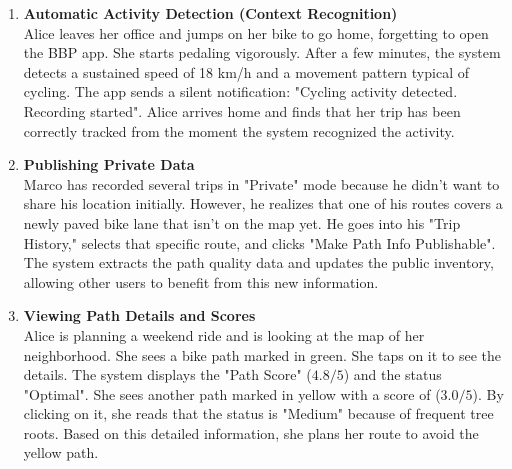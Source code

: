 \begin{enumerate}
    \item \textbf{Automatic Activity Detection (Context Recognition)} \\
    Alice leaves her office and jumps on her bike to go home, forgetting to open the BBP app. She starts pedaling vigorously. After a few minutes, the system detects a sustained speed of 18 km/h and a movement pattern typical of cycling. The app sends a silent notification: "Cycling activity detected. Recording started". Alice arrives home and finds that her trip has been correctly tracked from the moment the system recognized the activity.

    \item \textbf{Publishing Private Data} \\
    Marco has recorded several trips in "Private" mode because he didn't want to share his location initially. However, he realizes that one of his routes covers a newly paved bike lane that isn't on the map yet. He goes into his "Trip History," selects that specific route, and clicks "Make Path Info Publishable". The system extracts the path quality data and updates the public inventory, allowing other users to benefit from this new information.

    \item \textbf{Viewing Path Details and Scores} \\
    Alice is planning a weekend ride and is looking at the map of her neighborhood. She sees a bike path marked in green. She taps on it to see the details. The system displays the "Path Score" ($4.8/5$) and the status "Optimal". She sees another path marked in yellow with a score of ($3.0/5$). By clicking on it, she reads that the status is "Medium" because of frequent tree roots. Based on this detailed information, she plans her route to avoid the yellow path.
\end{enumerate}

